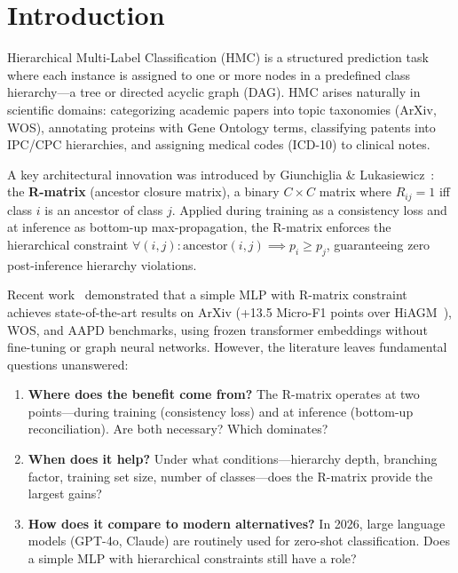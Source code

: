 \section{Introduction}
\label{sec:intro}

Hierarchical Multi-Label Classification (HMC) is a structured prediction
task where each instance is assigned to one or more nodes in a
predefined class hierarchy---a tree or directed acyclic graph (DAG).
HMC arises naturally in scientific domains: categorizing academic papers
into topic taxonomies (ArXiv, WOS), annotating proteins with Gene
Ontology terms, classifying patents into IPC/CPC hierarchies, and
assigning medical codes (ICD-10) to clinical notes.

A key architectural innovation was introduced by Giunchiglia \&
Lukasiewicz~\cite{giunchiglia2018hmc}: the \textbf{R-matrix} (ancestor
closure matrix), a binary $C \times C$ matrix where $R_{ij}=1$ iff class
$i$ is an ancestor of class $j$. Applied during training as a
consistency loss and at inference as bottom-up max-propagation, the
R-matrix enforces the hierarchical constraint $\forall (i,j):
\text{ancestor}(i,j) \implies p_i \geq p_j$, guaranteeing zero
post-inference hierarchy violations.

Recent work~\cite{sette2026hmctorch} demonstrated that a simple MLP with
R-matrix constraint achieves state-of-the-art results on ArXiv (+13.5
Micro-F1 points over HiAGM~\cite{zhou2020hiagm}), WOS, and AAPD
benchmarks, using frozen transformer embeddings without fine-tuning or
graph neural networks. However, the literature leaves fundamental
questions unanswered:

\begin{enumerate}[leftmargin=*,nosep]
  \item \textbf{Where does the benefit come from?} The R-matrix operates
    at two points---during training (consistency loss) and at inference
    (bottom-up reconciliation). Are both necessary? Which dominates?
  \item \textbf{When does it help?} Under what conditions---hierarchy
    depth, branching factor, training set size, number of classes---does
    the R-matrix provide the largest gains?
  \item \textbf{How does it compare to modern alternatives?} In 2026,
    large language models (GPT-4o, Claude) are routinely used for
    zero-shot classification. Does a simple MLP with hierarchical
    constraints still have a role?
\end{enumerate}

